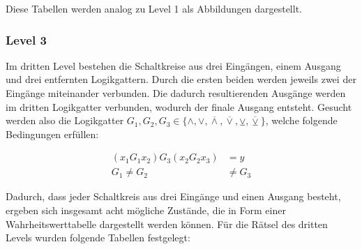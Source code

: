 Diese Tabellen werden analog zu Level 1 als Abbildungen dargestellt.

\subsubsection{Level 3}

Im dritten Level bestehen die Schaltkreise aus drei Eingängen, einem Ausgang und drei entfernten Logikgattern.
Durch die ersten beiden werden jeweils zwei der Eingänge miteinander verbunden.
Die dadurch resultierenden Ausgänge werden im dritten Logikgatter verbunden, wodurch der finale Ausgang entsteht.
Gesucht werden also die Logikgatter $G_1, G_2, G_3 \in \{\land , \lor , \overline{\land}, \overline{\lor}, \veebar, \overline{\veebar}\}$, welche folgende Bedingungen erfüllen:

\begin{align*}
    (x_1 G_1 x_2) G_3 (x_2 G_2 x_3) &= y\\
    G_1 \neq G_2 &\neq G_3 
\end{align*}

Dadurch, dass jeder Schaltkreis aus drei Eingänge und einen Ausgang besteht, ergeben sich insgesamt acht mögliche Zustände, die in Form einer Wahrheitswerttabelle dargestellt werden können.
Für die Rätsel des dritten Levels wurden folgende Tabellen festgelegt:


